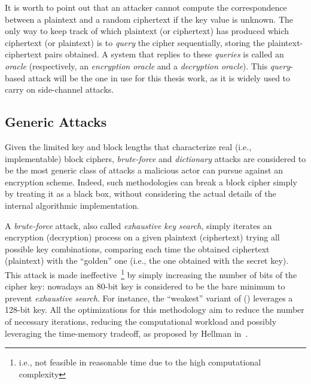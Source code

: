    It is worth to point out that an attacker cannot compute the correspondence between a plaintext and a random ciphertext if the key value is unknown. The only way to keep track of which plaintext (or ciphertext) has produced which ciphertext (or plaintext) is to \emph{query} the cipher sequentially, storing the plaintext-ciphertext pairs obtained. A system that replies to these \emph{queries} is called an \emph{oracle} (respectively, an \emph{encryption oracle} and a \emph{decryption oracle}). This \emph{query}-based attack will be the one in use for this thesis work, as it is widely used to carry on side-channel attacks.

    \subsection{Generic Attacks}\label{subsec:generic_att}
        Given the limited key and block lengths that characterize real (i.e., implementable) block ciphers, \emph{brute-force} and \emph{dictionary} attacks are considered to be the most generic class of attacks a malicious actor can pursue against an encryption scheme. Indeed, such methodologies can break a block cipher simply by treating it as a black box, without considering the actual details of the internal algorithmic implementation.
    
        A \emph{brute-force} attack, also called \emph{exhaustive key search}, simply iterates an encryption (decryption) process on a given plaintext (ciphertext) trying all possible key combinations, comparing each time the obtained ciphertext (plaintext) with the ``golden'' one (i.e., the one obtained with the secret key).
        This attack is made ineffective~\footnote{i.e., not feasible in reasonable time due to the high computational complexity} by simply increasing the number of bits of the cipher key: nowadays an 80-bit key is considered to be the bare minimum to prevent \emph{exhaustive search}. For instance, the ``weakest'' variant of \aes{} (\aess{}) leverages a 128-bit key.
        All the optimizations for this methodology aim to reduce the number of necessary iterations, reducing the computational workload and possibly leveraging the time-memory tradeoff, as proposed by Hellman in~\cite{hellman1980cryptanalytic}.
    
